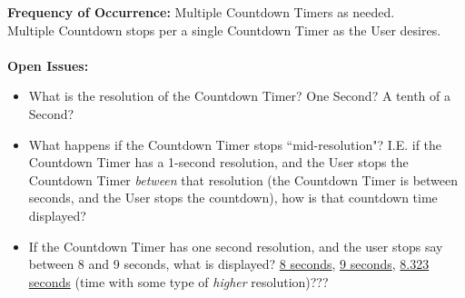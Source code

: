 \documentclass[letterpaper]{article}
\begin{document}
\textbf{Frequency of Occurrence:  }Multiple Countdown Timers as
needed.\\
Multiple Countdown stops per a single Countdown Timer as the User
desires.\\\\
\textbf{Open Issues:  }
\begin{itemize}
\item What is the resolution of the Countdown Timer? One Second? A tenth of a
Second?
\item What happens if the Countdown Timer stops ``mid-resolution"? I.E.
if the Countdown Timer has a 1-second resolution, and the User stops
the Countdown Timer \textit{between} that resolution (the Countdown
Timer is between seconds, and the User stops the countdown), how is
that countdown time displayed?
\item If the Countdown Timer has one second resolution, and the user
stops say between 8 and 9 seconds, what is displayed?
\underline{8 seconds}, \underline{9 seconds}, \underline{8.323 seconds}
(time with some type of \textit{higher} resolution)???
\end{itemize}
\end{document}
